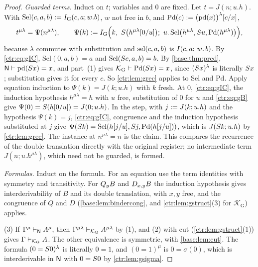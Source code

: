 \begin{proof}
\emph{Guarded terms.} Induct on $t$; variables and $0$ are fixed. Let $t=J(n;u.h)$. With
$\mathrm{Sel}(c,a,b)\mathrel{:=} I_{\mathrm G}(c,a;w.b)$, $w$ not free in $b$, and
$\mathrm{Pd}(c)\mathrel{:=}\bigl(\mathrm{pd}(x)\bigr)^\lambda[c/x]$,
\[
 t^{\mu\lambda}=\Psi(n^{\mu\lambda}),\qquad
 \Psi(k)\defeq I_{\mathrm G}\Bigl(k,\ \Suc\bigl(h^{\mu\lambda}\subst{0}{u}\bigr);\
 u.\,\mathrm{Sel}\bigl(h^{\mu\lambda},\Suc u,\mathrm{Pd}(h^{\mu\lambda})\bigr)\Bigr),
\]
because $\lambda$ commutes with substitution and $\operatorname{sel}(c,a,b)$ is $I(c,a;\,w.\,b)$. By
\eqref{ctr:eq:gIC}, $\mathrm{Sel}(0,a,b)=a$ and $\mathrm{Sel}(S c,a,b)=b$. By
\cref{base:thm:pred}, $\mathsf{N}\vdash\mathrm{pd}(S x)=x$, and part~(1) gives
$\mathcal K_{\mathrm G}\vdash\mathrm{Pd}(S x)=x$, since $(S x)^\lambda$ is literally
$S x$; substitution gives it for every $c$. So \cref{ctr:lem:grec} applies to
$\mathrm{Sel}$ and $\mathrm{Pd}$. Apply equation induction to $\Psi(k)=J(k;u.h)$ with $k$
fresh. At $0$, \eqref{ctr:eq:gIC}, the induction hypothesis $h^{\mu\lambda}=h$ with $u$ free,
substitution of $0$ for $u$ and \eqref{ctr:eq:gB} give
$\Psi(0)=S(h[0/u])=J(0;u.h)$. In the step, with $j\mathrel{:=} J(k;u.h)$ and the
hypothesis $\Psi(k)=j$, \eqref{ctr:eq:gIC}, congruence and the induction hypothesis
substituted at $j$ give
$\Psi(S k)=\mathrm{Sel}(h[j/u],S j,\mathrm{Pd}(h[j/u]))$, which is
$J(S k;u.h)$ by \cref{ctr:lem:grec}. The instance at $n^{\mu\lambda}=n$ is the claim.
This compares the recurrence of the double translation directly with the original register;
no intermediate term $J(n;u.h^{\mu\lambda})$, which need not be guarded, is formed.

\emph{Formulas.} Induct on the formula. For an equation use the term identities with
symmetry and transitivity. For $Q_{y}B$ and $D_{x,y}B$ the induction hypothesis gives
interderivability of $B$ and its double translation, with $x,y$ free, and the congruence of
$Q$ and $D$ (\cref{base:lem:bindercong}, and \cref{ctr:lem:gstruct}(3) for
$\mathcal K_{\mathrm G}$) applies.

(3) If $\Gamma^\mu\vdash_{\mathsf{N}}A^\mu$, then
$\Gamma^{\mu\lambda}\vdash_{\mathcal K_{\mathrm G}}A^{\mu\lambda}$ by (1), and (2) with cut
(\cref{ctr:lem:gstruct}(1)) gives $\Gamma\vdash_{\mathcal K_{\mathrm G}}A$. The other
equivalence is symmetric, with \cref{base:lem:cut}. The formula $(0=S 0)^\lambda$ is
literally $0=1$, and $(0=1)^\mu$ is $0=\sigma(0)$, which is interderivable in $\mathsf{N}$ with
$0=S 0$ by \cref{ctr:lem:gsigma}.


\end{proof}
